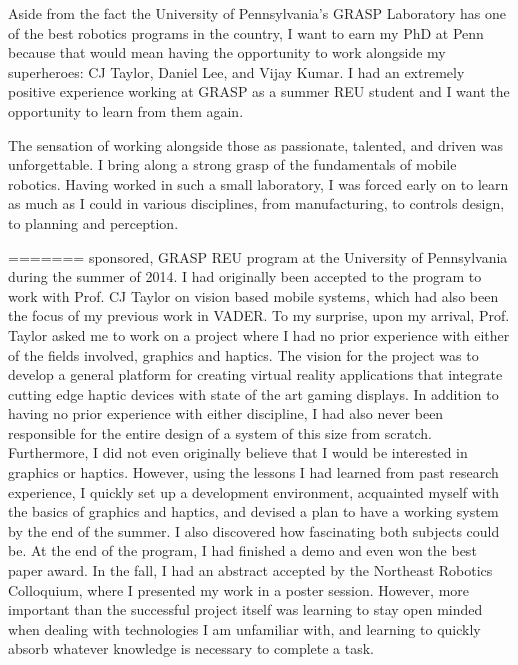 \documentclass[10pt]{article}
\begin{document}
Aside from the fact the University of Pennsylvania’s GRASP Laboratory has one
of the best robotics programs in the country, I want to earn my PhD at Penn
because that would mean having the opportunity to work alongside my
superheroes: CJ Taylor, Daniel Lee, and Vijay Kumar. I had an extremely
positive experience working at GRASP as a summer REU student and I want the
opportunity to learn from them again. 

The sensation of working alongside those as passionate, talented, and driven
was unforgettable.  I bring along a strong grasp of the fundamentals of mobile
robotics. Having worked in such a small laboratory, I was forced early on to
learn as much as I could in various disciplines, from manufacturing, to
controls design, to planning and perception. 

=======
sponsored, GRASP REU program at the University of Pennsylvania during the
summer of 2014. I had originally been accepted to the program to work with
Prof. CJ Taylor on vision based mobile systems, which had also been the focus
of my previous work in VADER. To my surprise, upon my arrival, Prof. Taylor
asked me to work on a project where I had no prior experience with either of
the fields involved, graphics and haptics. The vision for the project was to
develop a general platform for creating virtual reality applications that
integrate cutting edge haptic devices with state of the art gaming displays. In
addition to having no prior experience with either discipline, I had also never
been responsible for the entire design of a system of this size from scratch.
Furthermore, I did not even originally believe that I would be interested in
graphics or haptics.  However, using the lessons I had learned from past
research experience, I quickly set up a development environment, acquainted
myself with the basics of graphics and haptics, and devised a plan to have a
working system by the end of the summer. I also discovered how fascinating both
subjects could be. At the end of the program, I had finished a demo and even
won the best paper award. In the fall, I had an abstract accepted by the
Northeast Robotics Colloquium, where I presented my work in a poster session.
However, more important than the successful project itself was learning to stay
open minded when dealing with technologies I am unfamiliar with, and learning
to quickly absorb whatever knowledge is necessary to complete a task.
\end{document}
